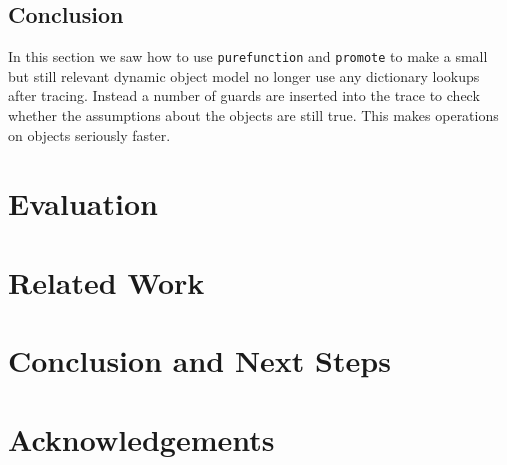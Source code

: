 \documentclass{sig-alternate}
\begin{document}

\subsection{Conclusion}

In this section we saw how to use \texttt{purefunction} and \texttt{promote} to make a
small but still relevant dynamic object model no longer use any dictionary lookups
after tracing. Instead a number of guards are inserted into the
trace to check whether the assumptions about the objects are still true. This
makes operations on objects seriously faster.

\section{Evaluation}
\label{sect:evaluation}

\section{Related Work}

\section{Conclusion and Next Steps}

\section*{Acknowledgements}



\end{document}
